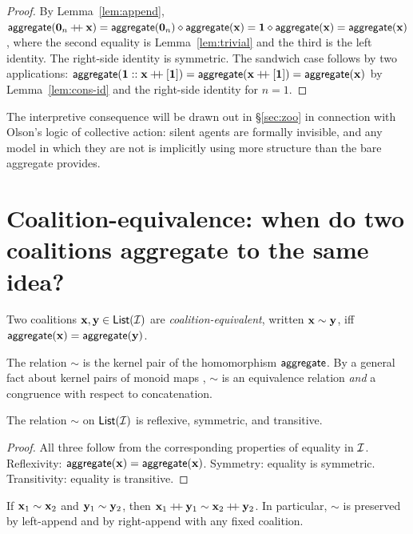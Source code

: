 \begin{proof}
By Lemma~\ref{lem:append}, $\mathsf{aggregate}(\mathbf{0}_n \mathbin{+\!\!+} \mathbf{x}) =
\mathsf{aggregate}(\mathbf{0}_n) \mathbin{\diamond} \mathsf{aggregate}(\mathbf{x}) = \mathbf{1} \mathbin{\diamond}
\mathsf{aggregate}(\mathbf{x}) = \mathsf{aggregate}(\mathbf{x})$, where the second equality is
Lemma~\ref{lem:trivial} and the third is the left identity. The
right-side identity is symmetric. The sandwich case follows by two
applications: $\mathsf{aggregate}(\mathbf{1} :: \mathbf{x} \mathbin{+\!\!+} [\mathbf{1}]) =
\mathsf{aggregate}(\mathbf{x} \mathbin{+\!\!+} [\mathbf{1}]) = \mathsf{aggregate}(\mathbf{x})$ by
Lemma~\ref{lem:cons-id} and the right-side identity for $n=1$.
\end{proof}

The interpretive consequence will be drawn out in
\S\ref{sec:zoo} in connection with Olson's logic of collective action:
silent agents are formally invisible, and any model in which they are
not is implicitly using more structure than the bare aggregate provides.

\section{Coalition-equivalence: when do two coalitions aggregate to the same idea?}
\label{sec:equiv}

\begin{definition}\label{def:equiv}
Two coalitions $\mathbf{x}, \mathbf{y} \in \mathsf{List}(\mathcal{I})$ are
\emph{coalition-equivalent}, written $\mathbf{x} \sim \mathbf{y}$, iff
$\mathsf{aggregate}(\mathbf{x}) = \mathsf{aggregate}(\mathbf{y})$.
\end{definition}

The relation $\sim$ is the kernel pair of the homomorphism
$\mathsf{aggregate}$. By a general fact about kernel pairs of monoid maps
\cite{Howie1995}, $\sim$ is an equivalence relation \emph{and} a
congruence with respect to concatenation.

\begin{proposition}\label{prop:equiv}
The relation $\sim$ on $\mathsf{List}(\mathcal{I})$ is reflexive, symmetric, and
transitive.
\end{proposition}

\begin{proof}
All three follow from the corresponding properties of equality in
$\mathcal{I}$. Reflexivity: $\mathsf{aggregate}(\mathbf{x}) = \mathsf{aggregate}(\mathbf{x})$.
Symmetry: equality is symmetric. Transitivity: equality is transitive.
\end{proof}

\begin{proposition}\label{prop:cong}
If $\mathbf{x}_1 \sim \mathbf{x}_2$ and $\mathbf{y}_1 \sim \mathbf{y}_2$, then
$\mathbf{x}_1 \mathbin{+\!\!+} \mathbf{y}_1 \sim \mathbf{x}_2 \mathbin{+\!\!+} \mathbf{y}_2$. In particular,
$\sim$ is preserved by left-append and by right-append with any
fixed coalition.
\end{proposition}

